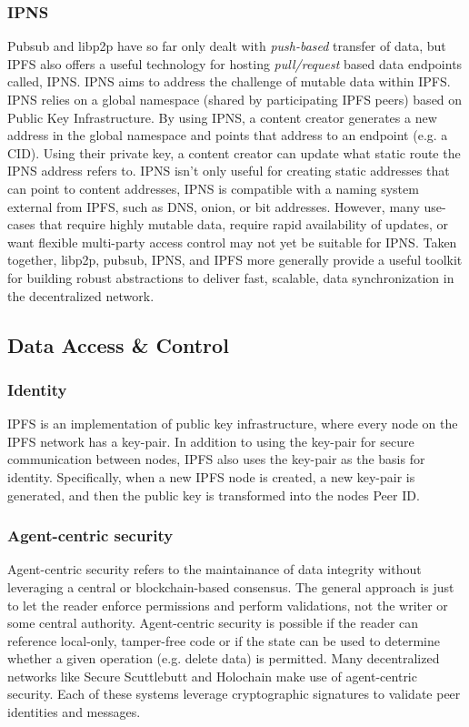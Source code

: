 \documentclass{textile}
\begin{document}
\subsubsection{IPNS}

Pubsub and libp2p have so far only dealt with \emph{push-based} transfer of data, but IPFS also offers a useful technology for hosting \emph{pull/request} based data endpoints called, IPNS. IPNS aims to address the challenge of mutable data within IPFS. IPNS relies on a global namespace (shared by participating IPFS peers) based on Public Key Infrastructure. By using IPNS, a content creator generates a new address in the global namespace and points that address to an endpoint (e.g. a CID). Using their private key, a content creator can update what static route the IPNS address refers to. IPNS isn't only useful for creating static addresses that can point to content addresses, IPNS is compatible with a naming system external from IPFS, such as DNS, onion, or bit addresses. However, many use-cases that require highly mutable data, require rapid availability of updates, or want flexible multi-party access control may not yet be suitable for IPNS. Taken together, libp2p, pubsub, IPNS, and IPFS more generally provide a useful toolkit for building robust abstractions to deliver fast, scalable, data synchronization in the decentralized network. 

\subsection{Data Access \& Control}

\subsubsection{Identity}

IPFS is an implementation of public key infrastructure, where every node on the IPFS network has a key-pair. In addition to using the key-pair for secure communication between nodes, IPFS also uses the key-pair as the basis for identity. Specifically, when a new IPFS node is created, a new key-pair is generated, and then the public key is transformed into the nodes Peer ID. 

\subsubsection{Agent-centric security}

Agent-centric security refers to the maintainance of data integrity without leveraging a central or blockchain-based consensus.
The general approach is just to let the reader enforce permissions and perform validations, not the writer or some central authority.
Agent-centric security is possible if the reader can reference local-only, tamper-free code or if the state can be used to determine whether a given operation (e.g. delete data) is permitted.
Many decentralized networks like Secure Scuttlebutt \cite{ScuttlebuttProtocolGuide} and Holochain \cite{ericharris-braunHolochainScalableAgentcentric2018} make use of agent-centric security.
Each of these systems leverage cryptographic signatures to validate peer identities and messages.
\end{document}
